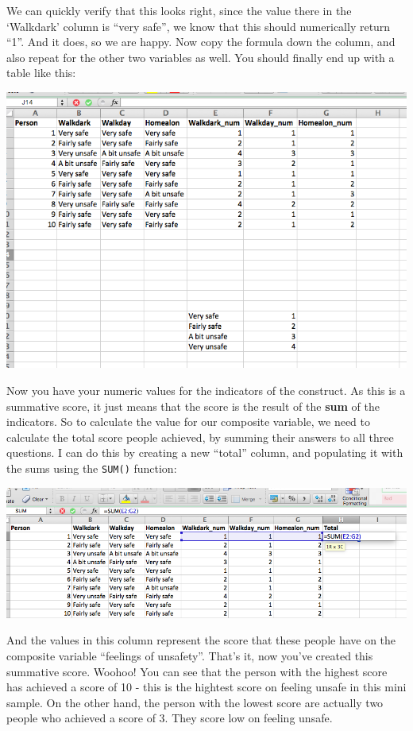 \documentclass[
]{book}
\begin{document}
We can quickly verify that this looks right, since the value there in the `Walkdark' column is ``very safe'', we know that this should numerically return ``1''. And it does, so we are happy. Now copy the formula down the column, and also repeat for the other two variables as well. You should finally end up with a table like this:

\includegraphics{imgs/final_lookup.png}

Now you have your numeric values for the indicators of the construct. As this is a summative score, it just means that the score is the result of the \textbf{sum} of the indicators. So to calculate the value for our composite variable, we need to calculate the total score people achieved, by summing their answers to all three questions. I can do this by creating a new ``total'' column, and populating it with the sums using the \texttt{SUM()} function:

\includegraphics{imgs/tot_sum_alpha.png}

And the values in this column represent the score that these people have on the composite variable ``feelings of unsafety''. That's it, now you've created this summative score. Woohoo! You can see that the person with the highest score has achieved a score of 10 - this is the hightest score on feeling unsafe in this mini sample. On the other hand, the person with the lowest score are actually two people who achieved a score of 3. They score low on feeling unsafe.
\end{document}
